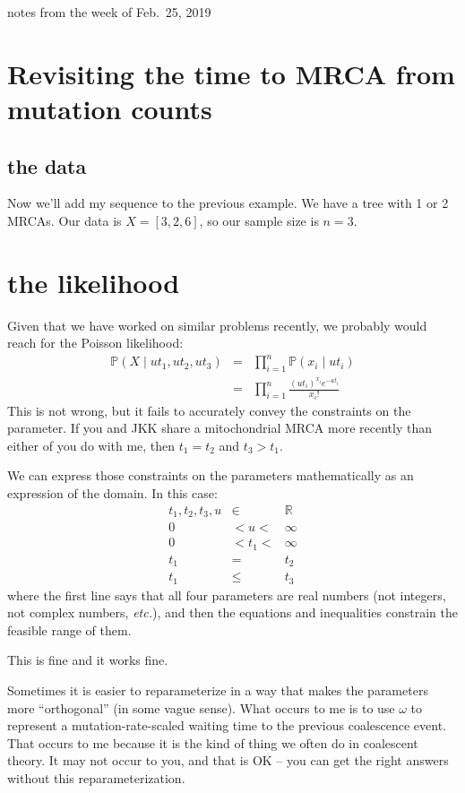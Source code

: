 \documentclass[11pt]{article}
\renewcommand{\Pr}{\mathbb{P}}
\begin{document}
notes from the week of Feb.~25, 2019 \\
\tableofcontents


\section{Revisiting the time to MRCA from mutation counts}
\subsection{the data}
Now we'll add my sequence to the previous example.
We have a tree with 1 or 2 MRCAs.
Our data is
$X=[3,2,6]$,
so our sample size is $n=3$.

\section{the likelihood}
Given that we have worked on similar problems recently, we probably would reach
for the Poisson likelihood:
\begin{eqnarray}
\Pr(X\mid ut_1, ut_2, ut_3)& = & \prod_{i=1}^{n} \Pr(x_i\mid ut_i)\\
& = & \prod_{i=1}^{n} \frac{(ut_i)^{x_i}e^{-ut_i}}{x_i ! }
\end{eqnarray}
This is not wrong, but it fails to accurately convey the constraints on the parameter.
If you and JKK share a mitochondrial MRCA more recently than either of you do with me, then $t_1=t_2$ and $t_3> t_1$.

We can express those constraints on the parameters mathematically as an expression of the domain.
In this case: 
\begin{eqnarray}
    t_1, t_2, t_3, u & \in &  \mathbb{R}\\
    0 & < u < & \infty\\
    0 & < t_1 < & \infty\\
    t_1 & = & t_2 \\
    t_1 & \leq & t_3
\end{eqnarray}
where the first line says that all four parameters are real numbers (not integers, 
not complex numbers, {\em etc.}), and then the equations and inequalities constrain
the feasible range of them.

This is fine and it works fine.

Sometimes it is easier to reparameterize in a way that makes the parameters more
``orthogonal'' (in some vague sense).
What occurs to me is to use $\omega$ to represent a mutation-rate-scaled waiting
time to the previous coalescence event.
That occurs to me because it is the kind of thing we often do in coalescent theory.
It may not occur to you, and that is OK -- you can get the right answers without
this reparameterization.
\end{document}
